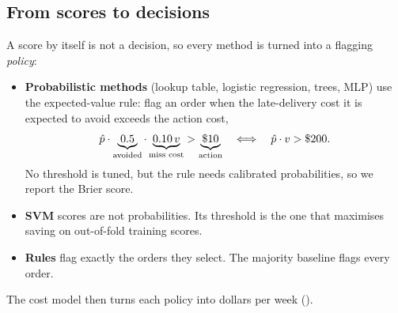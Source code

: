 \subsection{From scores to decisions}
\label{subsec:policy}
A score by itself is not a decision, so every method is turned into a flagging
\emph{policy}:
\begin{itemize}
  \item \textbf{Probabilistic methods} (lookup table, logistic regression, trees, MLP) use the
        expected-value rule\cite{elkan2001}: flag an order when the late-delivery cost it is
        expected to avoid exceeds the action cost,
        \begin{equation}
          \hat p \cdot \underbrace{0.5}_{\text{avoided}} \cdot \underbrace{0.10\,v}_{\text{miss cost}} > \underbrace{\$10}_{\text{action}}
          \quad\Longleftrightarrow\quad \hat p \cdot v > \$200.
          \label{eq:ev}
        \end{equation}
        No threshold is tuned, but the rule needs calibrated probabilities, so we report the
        Brier score.
  \item \textbf{SVM} scores are not probabilities. Its threshold is the one that maximises
        saving on out-of-fold training scores.
  \item \textbf{Rules} flag exactly the orders they select. The majority baseline flags every
        order.
\end{itemize}
The cost model then turns each policy into dollars per week ().
